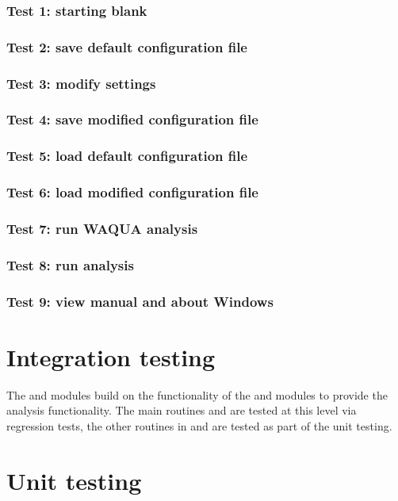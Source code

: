 \subsubsection{Test 1: starting blank}
\subsubsection{Test 2: save default configuration file}
\subsubsection{Test 3: modify settings}
\subsubsection{Test 4: save modified configuration file}
\subsubsection{Test 5: load default configuration file}
\subsubsection{Test 6: load modified configuration file}
\subsubsection{Test 7: run WAQUA analysis}
\subsubsection{Test 8: run \dflowfm analysis}
\subsubsection{Test 9: view manual and about Windows}

\section{Integration testing}

The  and  modules build on the functionality of the  and  modules to provide the analysis functionality.
The main routines  and  are tested at this level via regression tests, the other routines in  and  are tested as part of the unit testing.

\section{Unit testing}

